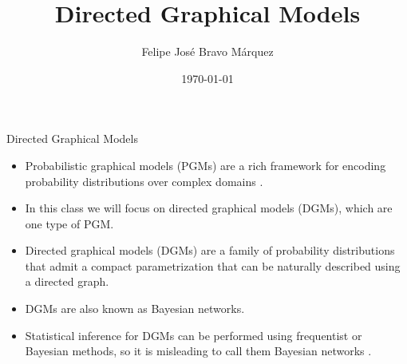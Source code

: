 \documentclass[handout]{beamer}
\title{Directed Graphical Models}
\author[Felipe Bravo Márquez]{\footnotesize
 \textcolor[rgb]{0.00,0.00,1.00}{Felipe José Bravo Márquez}}
\date{ \today }
\begin{document}
\begin{frame}
\titlepage


\end{frame}




\begin{frame}{Directed Graphical Models}
\scriptsize{
\begin{itemize}
\item Probabilistic graphical models (PGMs) are a rich framework for encoding probability distributions over complex domains  \cite{koller2009probabilistic}.

\item In this class we will focus on directed graphical models (DGMs), which are one type of PGM.

\item Directed graphical models (DGMs) are a family of probability distributions that admit a compact parametrization that can be naturally described using a directed graph.

\item DGMs are also known as Bayesian networks.

\item Statistical inference for DGMs can be performed using frequentist or Bayesian methods, so it is misleading to call them Bayesian networks \cite{wasserman2013all}.



 
\end{itemize}



} 

\end{frame}
\end{document}
